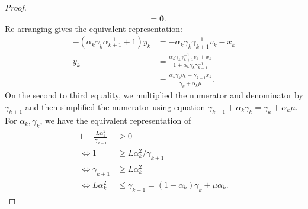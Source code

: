 \documentclass[12pt]{article}
\begin{document}
\begin{proof}
\begin{align*}
            &= \mathbf 0. 
        \end{align*}
        Re-arranging gives the equivalent representation: 
        \begin{align*}
            -(\alpha_k \gamma_k\alpha_{k + 1}^{-1} + 1)y_k
            &= 
            - \alpha_k \gamma_k \gamma_{k + 1}^{-1}v_k - x_k
            \\
            y_k &= 
            \frac{
                \alpha_k \gamma_k \gamma_{k + 1}^{-1}v_k + x_k
            }{1 + \alpha_k \gamma_k \gamma_{k + 1}^{-1}}
            \\
            &=  
            \frac{\alpha_k \gamma_k v_k + \gamma_{k + 1}x_k}{\gamma_k + \alpha_k \mu}. 
        \end{align*}
        On the second to third equality, we multiplied the numerator and denominator by $\gamma_{k + 1}$ and then simplified the numerator using equation $\gamma_{k + 1} + \alpha_k \gamma_k = \gamma_k + \alpha_k \mu$. 
        For $\alpha_k, \gamma_k$, we have the equivalent representation of 
        \begin{align*}
            1 - \frac{L \alpha_k^2}{\gamma_{k + 1}}
            &\ge 0
            \\
            \iff 1 &\ge L \alpha_k^2 / \gamma_{k + 1}
            \\
            \iff 
            \gamma_{k + 1} &\ge L \alpha_k^2
            \\
            \iff 
            L\alpha_k^2 
            &\le
            \gamma_{k + 1} = (1 - \alpha_k)\gamma_k + \mu \alpha_k. 
        \end{align*}
    \end{proof}
    
\end{document}
